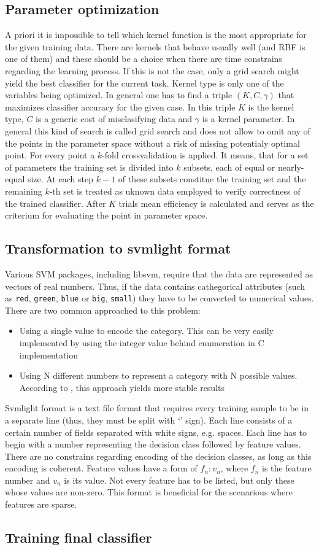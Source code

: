 \subsection{Parameter optimization}
A priori it is impossible to tell which kernel function is the most appropriate for the given training data. There are kernels that behave usually well (and RBF is one of them) and these should be a choice when there are time constrains regarding the learning process. If this is not the case, only a grid search might yield the best classifier for the current task.
\quad
Kernel type is only one of the variables being optimized. In general one has to find a triple $(K, C, \gamma)$ that maximizes classifier accuracy for the given case. In this triple $K$ is the kernel type, $C$ is a generic cost of misclasifying data and $\gamma$ is a kernel parameter. In general this kind of search is called grid search and does not allow to omit any of the points in the parameter space without a risk of missing potentialy optimal point.
\quad
For every point a $k$-fold crossvalidation is applied. It means, that for a set of parameters the training set is divided into $k$ subsets, each of equal or nearly-equal size. At each step $k-1$ of these subsets constitue the training set and the remaining $k$-th set is treated as uknown data employed to verify correctness of the trained classifier. After $K$ trials mean efficiency is calculated and serves as the criterium for evaluating the point in parameter space.
\subsection{Transformation to svmlight format}
Various SVM packages, including libsvm, require that the data are represented as vectors of real numbers. Thus, if the data contains cathegorical attributes (such as \verb+red+, \verb+green+, \verb+blue+ or \verb+big+, \verb+small+) they have to be converted to numerical values. There are two common approached to this problem:
\begin{itemize}
\item Using a single value to encode the category. This can be very easily implemented by using the integer value behind enumeration in C implementation
\item Using N different numbers to represent a category with N possible values. According to \cite{Chih-WeiHsu2010}, this approach yields more stable results
\end{itemize}
\qquad
Svmlight format is a text file format that requires every training sample to be in a separate line (thus, they must be split with `\n' sign). Each line consists of a certain number of fields separated with white signs, e.g. spaces. Each line has to begin with a number representing the decision class followed by feature values. There are no constrains regarding encoding of the decision classes, as long as this encoding is coherent. Feature values have a form of $f_n:v_n$, where $f_n$ is the feature number and $v_n$ is its value. Not every feature has to be listed, but only these whose values are non-zero. This format is beneficial for the scenarious where features are sparse.
\subsection{Training final classifier}